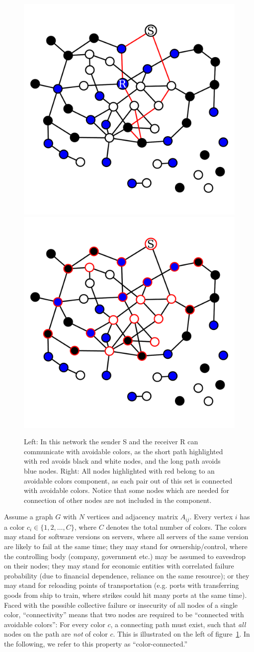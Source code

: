 \documentclass[aps, pre, twocolumn, a4paper, floatfix]{revtex4}
\begin{document}
\begin{figure}[htb]
\begin{center}
    \includegraphics[width=0.49\columnwidth]{graph_sr.pdf}
    \includegraphics[width=0.49\columnwidth]{graph_Gcolor.pdf}
    \caption{Left: In this network the sender S and the receiver R can communicate 
    with avoidable colors, as the short path highlighted with red avoids black and 
    white nodes, and the long path avoids blue nodes. Right: All nodes highlighted 
    with red belong to an avoidable colors component, as each pair out of this set 
    is connected with avoidable colors. Notice that some nodes which are needed 
    for connection of other nodes are not included in the component.}
    \label{fig:avoidable_colors}
\end{center}
\end{figure}
%
Assume a graph $G$ with $N$ vertices and adjacency matrix $A_{ij}$. Every vertex 
$i$ has a color $c_i\in\{1,2,\dots,C\}$, where $C$ denotes the total number of colors. 
The colors may stand for software versions on servers, where all servers of the 
same version are likely to fail at the same time; 
they may stand for ownership/control, where the controlling body (company, government etc.) may be assumed to eavesdrop on their nodes;
they may stand for economic entities with correlated failure probability (due to financial dependence, reliance on the same resource); 
or they may stand for reloading points of transportation (e.g. ports with transferring goods from ship to train, where strikes could hit many ports at the same time). 
Faced with the possible collective failure or insecurity of all nodes of a single color, 
``connectivity'' means that two nodes are required to be ``connected with avoidable colors'': 
For every color $c$, a connecting path must exist, such that \textit{all} nodes 
on the path are \textit{not} of color $c$. This is illustrated on the left of 
figure~\ref{fig:avoidable_colors}. 
In the following, we refer to this property as ``color-connected.''
\end{document}
